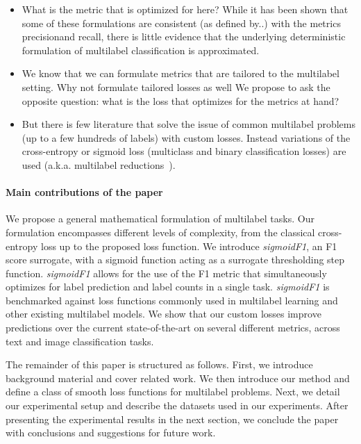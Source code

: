 \begin{itemize}[leftmargin=*,nosep]
\item{What is the metric that is optimized for here? While it has been shown that some of these formulations are consistent (as defined by..) with the metrics precision\@K and recall\@K, there is little evidence that the underlying deterministic formulation of multilabel classification is approximated.}
\item{We know that we can formulate metrics that are tailored to the multilabel setting. Why not formulate tailored losses as well
We propose to ask the opposite question: what is the loss that optimizes for the metrics at hand?}
\item{But there is few literature that solve the issue of common multilabel problems (up to a few hundreds of labels) with custom losses. Instead variations of the cross-entropy or sigmoid loss (multiclass and binary classification losses) are used (a.k.a. multilabel reductions~\cite{multilabelReduction}).}
\end{itemize}
\fi

\paragraph{Main contributions of the paper}
We propose a general mathematical formulation of multilabel tasks.
Our formulation encompasses different levels of complexity, from the classical cross-entropy loss up to the proposed loss function. We introduce \emph{sigmoidF1}, an F1 score surrogate, with a sigmoid function acting as a surrogate thresholding step function.
\emph{sigmoidF1} allows for the use of the F1 metric that simultaneously optimizes for label prediction and label counts in a single task.
\emph{sigmoidF1} is benchmarked against loss functions commonly used in multilabel learning and other existing multilabel models. We show that our custom losses improve predictions over the current state-of-the-art on several different metrics, across text and image classification tasks.

\vspace{0.5\baselineskip}
The remainder of this paper is structured as follows. First, we introduce background material and cover related work. We then introduce our method and define a class of smooth loss functions for multilabel problems. Next, we detail our experimental setup and describe the datasets used in our experiments. After presenting the experimental results in the next section, we conclude the paper with conclusions and suggestions for future work.





